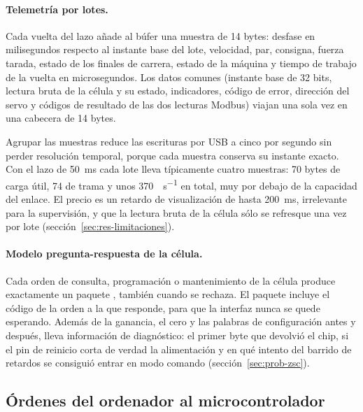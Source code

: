 \paragraph{Telemetría por lotes.} Cada vuelta del lazo añade al búfer una muestra de 14 bytes:
desfase en milisegundos respecto al instante base del lote, velocidad, par, consigna, fuerza
tarada, estado de los finales de carrera, estado de la máquina y tiempo de trabajo de la vuelta en
microsegundos. Los datos comunes (instante base de 32 bits, lectura bruta de la célula y su estado,
indicadores, código de error, dirección del servo y códigos de resultado de las dos lecturas
Modbus) viajan una sola vez en una cabecera de 14 bytes.

Agrupar las muestras reduce las escrituras por USB a cinco por segundo sin perder resolución
temporal, porque cada muestra conserva su instante exacto. Con el lazo de \SI{50}{\milli\second}
cada lote lleva típicamente cuatro muestras: 70 bytes de carga útil, 74 de trama y unos
\SI{370}{\byte\per\second} en total, muy por debajo de la capacidad del enlace. El precio es un
retardo de visualización de hasta \SI{200}{\milli\second}, irrelevante para la supervisión, y que la
lectura bruta de la célula sólo se refresque una vez por lote (sección~\ref{sec:res-limitaciones}).

\paragraph{Modelo pregunta-respuesta de la célula.} Cada orden de consulta, programación o
mantenimiento de la célula produce exactamente un paquete , también cuando se rechaza.
El paquete incluye el código de la orden a la que responde, para que la interfaz nunca se quede
esperando. Además de la ganancia, el cero y las palabras de configuración antes y después, lleva
información de diagnóstico: el primer byte que devolvió el chip, si el pin de reinicio corta de
verdad la alimentación y en qué intento del barrido de retardos se consiguió entrar en modo comando
(sección~\ref{sec:prob-zsc}).

\subsection{Órdenes del ordenador al microcontrolador}

